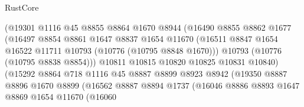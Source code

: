 \begin{lexlean}{RustCore}
\begin{coremodule}
                                (@19301
                                  @1116
                                  @45
                                  @8855
                                  @8864
                                  @1670
                                  @8944
                                  (@16490
                                    @8855
                                    @8862
                                    @1677
                                    (@16497
                                      @8854
                                      @8861
                                      @1647
                                      @8837
                                      @1654
                                      @11670
                                      (@16511
                                        @8847
                                        @1654
                                        @16522
                                        @11711
                                        @10793
                                        (@10776 (@10795 @8848 @1670)))
                                      @10793
                                      (@10776 (@10795 @8838 @8854)))
                                    @10811
                                    @10815
                                    @10820
                                    @10825
                                    @10831
                                    @10840)
                                  (@15292
                                    @8864
                                    @718
                                    @1116
                                    @45
                                    @8887
                                    @8899
                                    @8923
                                    @8942
                                    (@19350
                                      @8887
                                      @8896
                                      @1670
                                      @8899
                                      (@16562
                                        @8887
                                        @8894
                                        @1737
                                        (@16046
                                          @8886
                                          @8893
                                          @1647
                                          @8869
                                          @1654
                                          @11670
                                          (@16060

\end{coremodule}
\end{lexlean}
